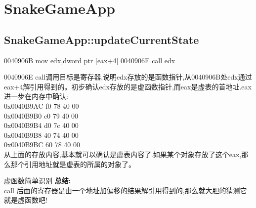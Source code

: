 \documentclass[AutoFakeBold,AutoFakeSlant]{beamer}
\begin{document}

\section{SnakeGameApp}
\subsection{SnakeGameApp::updateCurrentState}

\begin{frame}[fragile]
    \begin{x86asmcode}
        0040906B  mov   edx,dword ptr [eax+4]
        0040906E  call  edx\end{x86asmcode}
    0040906E call调用目标是寄存器,说明edx存放的是函数指针,从0040906B处edx通过eax+4解引用得到的。初步确认edx存放的是虚函数指针,而eax是虚表的首地址.eax进一步在内存中确认:\\
    0x0040B9AC  f0 78 40 00  \\
    0x0040B9B0  c0 79 40 00  \\
    0x0040B9B4  d0 7c 40 00  \\
    0x0040B9B8  40 74 40 00  \\
    0x0040B9BC  60 78 40 00  \\
    从上面的存放内容,基本就可以确认是虚表内容了.如果某个对象存放了这个eax,那么那个引用地址就是虚表的所属的对象了。
\end{frame}

\begin{frame}[fragile]{虚函数简单识别}
    \textbf{总结:} \\ call 后面的寄存器是由一个地址加偏移的结果解引用得到的,那么就大胆的猜测它就是虚函数吧!
\end{frame}
\end{document}
